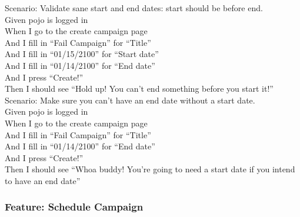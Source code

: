 \documentclass[12pt]{article}
\begin{document}
\begin{hangparas}{0.25in}{1}
Scenario: Validate sane start and end dates: start should be before end. \\
Given pojo is logged in \\
When I go to the create campaign page \\
And I fill in ``Fail Campaign'' for ``Title'' \\
And I fill in ``01/15/2100'' for ``Start date'' \\
And I fill in ``01/14/2100'' for ``End date'' \\
And I press ``Create!'' \\
Then I should see ``Hold up! You can't end something before you start it!'' \\

Scenario: Make sure you can't have an end date without a start date. \\
Given pojo is logged in \\
When I go to the create campaign page \\
And I fill in ``Fail Campaign'' for ``Title'' \\
And I fill in ``01/14/2100'' for ``End date'' \\
And I press ``Create!'' \\
Then I should see ``Whoa buddy! You're going to need a start date if you intend to have an end date'' \\
\end{hangparas}

\subsubsection{Feature: Schedule Campaign}
\end{document}

